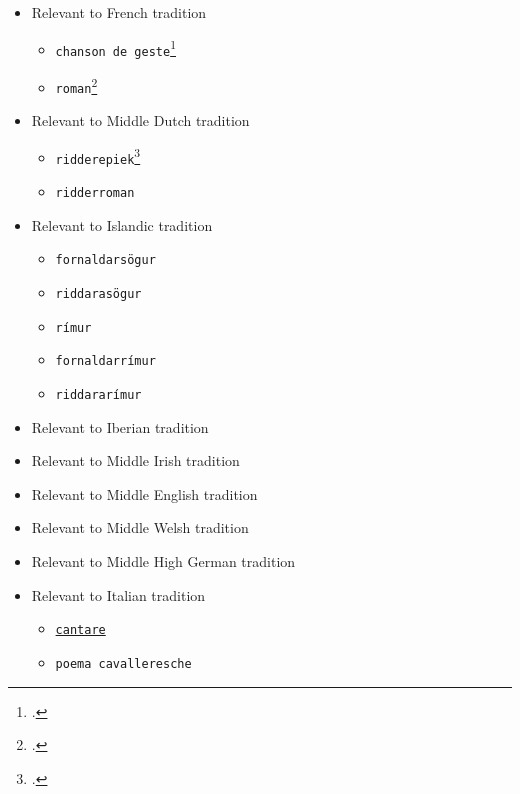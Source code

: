 \begin{itemize}
    \begin{multicols}{2}
        \begin{itemize}
            \item Relevant to French tradition
                \begin{itemize}
                    \item \texttt{chanson de geste}\footcite[][]{Comfort1904}
                    \item \texttt{roman}\footcite[][]{Comfort1904}
                \end{itemize}
            \item Relevant to Middle Dutch tradition
                \begin{itemize}
                    \item \texttt{ridderepiek}\footcite[][]{kienhorst1988handschriften}
                    \item \texttt{ridderroman}
                \end{itemize}
            \item Relevant to Islandic tradition
                \begin{itemize}
                    \item \texttt{fornaldarsögur}
                    \item \texttt{riddarasögur}
                    \item \texttt{rímur}
                    \item \texttt{fornaldarrímur}
                    \item \texttt{riddararímur}
                \end{itemize}
            \item Relevant to Iberian tradition
            \item Relevant to Middle Irish tradition
            \item Relevant to Middle English tradition
            \item Relevant to Middle Welsh tradition
            \item Relevant to Middle High German tradition
            \item Relevant to Italian tradition
            \begin{itemize}
                \item \href{https://www.oxfordbibliographies.com/display/document/obo-9780195396584/obo-9780195396584-0199.xml}{\texttt{cantare}}
                \item \texttt{poema cavalleresche}

\end{itemize}
\end{itemize}
\end{multicols}
\end{itemize}
